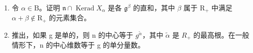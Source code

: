 \begin{enumerate}
\def\labelenumi{\alph{enumi})}
\item
  令 \(\alpha \in \mathrm{B}\)。证明 \(\mathfrak{n} \cap \operatorname{Kerad} X_{\alpha}\) 是各 \(\mathfrak{g}^{\beta}\) 的直和，其中 \(\beta\) 属于 \(\mathrm{R}_{+}\) 中满足 \(\alpha + \beta \notin \mathrm{R}_{+}\) 的元素集合。
\item
  推出，如果 g 是单的，则 n 的中心等于 \(g^{\tilde{\alpha}}\)，其中 \(\tilde{\alpha}\) 是 \(R_{+}\) 的最高根。在一般情形下，n 的中心维数等于 g 的单分量数。
\end{enumerate}
\relax{}

